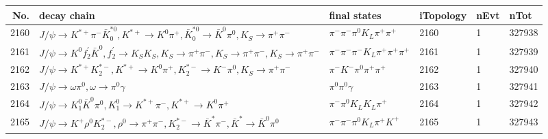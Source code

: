 \begin{table}[htbp] 
\begin{center}
\begin{small}
\begin{tabular}{rlllll}\hline\hline
 No. & decay chain & final states &  iTopology & nEvt & nTot \\\hline
2160&$J/\psi       \rightarrow K^{*+}         \pi^{-}        \bar{K}_0^{*0}, K^{*+}          \rightarrow K^{0}          \pi^{+}        , \bar{K}_0^{*0} \rightarrow \bar{K}^{0}   \pi^{0}        , K_{S}           \rightarrow \pi^{+}        \pi^{-}        $&$\pi^{-}        \pi^{-}        \pi^{0}        K_{L}          \pi^{+}        \pi^{+}        $& 2160&    1&327938\\
2161&$J/\psi       \rightarrow K^{0}          f_2^{'}       \bar{K}^{0}   , f_2^{'}        \rightarrow K_{S}          K_{S}          , K_{S}           \rightarrow \pi^{+}        \pi^{-}        , K_{S}           \rightarrow \pi^{+}        \pi^{-}        , K_{S}           \rightarrow \pi^{+}        \pi^{-}        $&$\pi^{-}        \pi^{-}        \pi^{-}        K_{L}          \pi^{+}        \pi^{+}        \pi^{+}        $& 2161&    1&327939\\
2162&$J/\psi       \rightarrow K^{*+}         K_2^{*-}       , K^{*+}          \rightarrow K^{0}          \pi^{+}        , K_2^{*-}        \rightarrow K^{-}          \pi^{0}        , K_{S}           \rightarrow \pi^{+}        \pi^{-}        $&$\pi^{-}        K^{-}          \pi^{0}        \pi^{+}        \pi^{+}        $& 2162&    1&327940\\
2163&$J/\psi       \rightarrow \omega         \pi^{0}        , \omega          \rightarrow \pi^{0}        \gamma       $&$\pi^{0}        \pi^{0}        \gamma       $& 2163&    1&327941\\
2164&$J/\psi       \rightarrow K_1^{0}        \bar{K}^{0}   \pi^{0}        , K_1^{0}         \rightarrow K^{*+}         \pi^{-}        , K^{*+}          \rightarrow K^{0}          \pi^{+}        $&$\pi^{-}        \pi^{0}        K_{L}          K_{L}          \pi^{+}        $& 2164&    1&327942\\
2165&$J/\psi       \rightarrow K^{+}          \rho^{0}      K_2^{*-}       , \rho^{0}       \rightarrow \pi^{+}        \pi^{-}        , K_2^{*-}        \rightarrow \bar{K}^{*}   \pi^{-}        , \bar{K}^{*}    \rightarrow \bar{K}^{0}   \pi^{0}        $&$\pi^{-}        \pi^{-}        \pi^{0}        K_{L}          \pi^{+}        K^{+}          $& 2165&    1&327943\\

\end{tabular}
\end{small}
\end{center}
\end{table}
